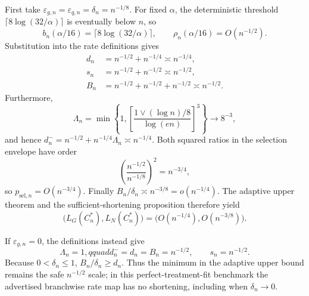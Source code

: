 First take \(\varepsilon_{g,n}=\varepsilon_{q,n}=\delta_n=n^{-1/8}\).  For fixed \(\alpha\), the deterministic threshold \(\lceil8\log(32/\alpha)\rceil\) is eventually below \(n\), so
\[
b_n(\alpha/16)=\lceil8\log(32/\alpha)\rceil,
\qquad \rho_n(\alpha/16)=O(n^{-1/2}).
\]
Substitution into the rate definitions gives
\[
\begin{aligned}
d_n&=n^{-1/2}+n^{-1/4}\asymp n^{-1/4},\\
s_n&=n^{-1/2}+n^{-1/2}\asymp n^{-1/2},\\
B_n&=n^{-1/2}+n^{-1/2}+n^{-1/2}\asymp n^{-1/2}.
\end{aligned}
\]
Furthermore,
\[
\Lambda_n
=\min\left\{1,
\left[\frac{1\vee(\log n)/8}{\log(en)}\right]^3\right\}
\longrightarrow8^{-3},
\]
and hence \(d_n^-=n^{-1/2}+n^{-1/4}\Lambda_n\asymp n^{-1/4}\).  Both squared ratios in the selection envelope have order
\[
\left(\frac{n^{-1/2}}{n^{-1/8}}\right)^2=n^{-3/4},
\]
so \(p_{\mathrm{sel},n}=O(n^{-3/4})\).  Finally \(B_n/\delta_n\asymp n^{-3/8}=o(n^{-1/4})\).  The adaptive upper theorem and the sufficient-shortening proposition therefore yield
\[
\bigl(L_G(C_n^*),L_N(C_n^*)\bigr)
=\bigl(O(n^{-1/4}),O(n^{-3/8})\bigr).
\]

If \(\varepsilon_{g,n}=0\), the definitions instead give
\[
\Lambda_n=1,qquad
d_n^-=d_n=B_n=n^{-1/2},
\qquad s_n=n^{-1/2}.
\]
Because \(0<\delta_n\le1\), \(B_n/\delta_n\ge d_n\).  Thus the minimum in the adaptive upper bound remains the safe \(n^{-1/2}\) scale; in this perfect-treatment-fit benchmark the advertised branchwise rate map has no shortening, including when \(\delta_n\to0\).
